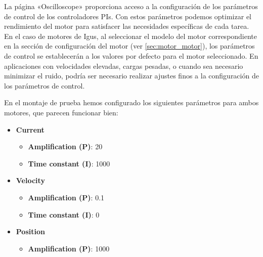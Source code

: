 \documentclass[english,spanish,a4paper,11pt]{article}
\begin{document}
La página «Oscilloscope» proporciona acceso a la configuración de los parámetros de control de los controladores \acp{PI}. Con estos parámetros podemos optimizar el rendimiento del motor para satisfacer las necesidades específicas de cada tarea. En el caso de motores de Igus, al seleccionar el modelo del motor correspondiente en la sección de configuración del motor (ver \cref{sec:motor_motor}), los parámetros de control se establecerán a los valores por defecto para el motor seleccionado. En aplicaciones con velocidades elevadas, cargas pesadas, o cuando sea necesario minimizar el ruido, podría ser necesario realizar ajustes finos a la configuración de los parámetros de control.

 En el montaje de prueba hemos configurado los siguientes parámetros para ambos motores, que parecen funcionar bien:
 
\begin{itemize}
    \item \textbf{Current}
    \begin{itemize}
        \item \textbf{Amplification (P)}: 20
        \item \textbf{Time constant (I)}: 1000
    \end{itemize}
    
    \item \textbf{Velocity}
    \begin{itemize}
        \item \textbf{Amplification (P)}: 0.1
        \item \textbf{Time constant (I)}: 0
    \end{itemize}
    
    \item \textbf{Position}
    \begin{itemize}
        \item \textbf{Amplification (P)}: 1000
    \end{itemize}
\end{itemize}
\end{document}
